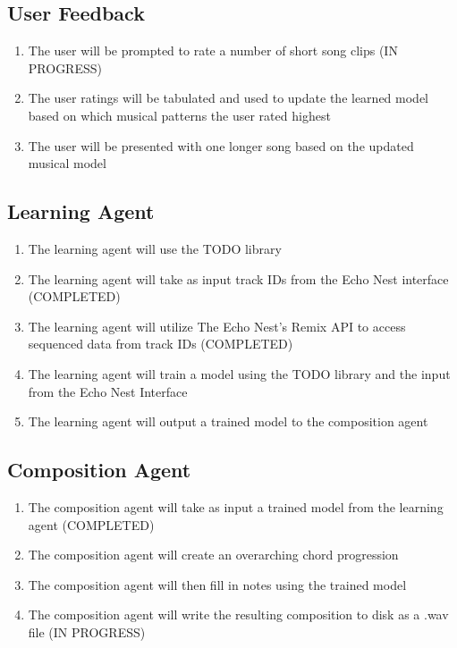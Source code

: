 \documentclass{article}
\begin{document}
\subsection{User Feedback}
\begin{enumerate}
\Large{TODO: we aren't doing any of this any more, are we?}
\item The user will be prompted to rate a number of short song clips (IN PROGRESS)
\item The user ratings will be tabulated and used to update the learned model based on which musical patterns the user rated highest
\item The user will be presented with one longer song based on the updated musical model
\end{enumerate}

\subsection{Learning Agent}
\begin{enumerate}
\item The learning agent will use the TODO library
\item The learning agent will take as input track IDs from the Echo Nest interface (COMPLETED)
\item The learning agent will utilize The Echo Nest's Remix API \cite{Remix} to access sequenced data from track IDs (COMPLETED)
\item The learning agent will train a model using the TODO library and the input from the Echo Nest Interface 
\item The learning agent will output a trained model to the composition agent 
\end{enumerate}

\subsection{Composition Agent}
\begin{enumerate}
\Large{TODO: This is completely differet, based largely on the learner}
\item The composition agent will take as input a trained model from the learning agent (COMPLETED)
\item The composition agent will create an overarching chord progression
\item The composition agent will then fill in notes using the trained model
\item The composition agent will write the resulting composition to disk as a .wav file (IN PROGRESS)
\end{enumerate}
\end{document}
